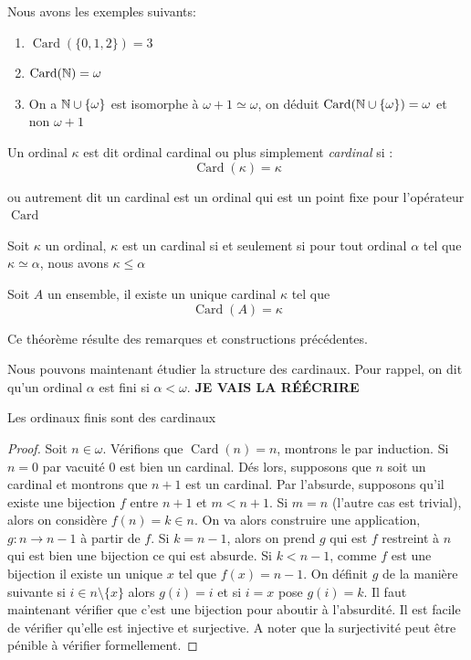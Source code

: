 \begin{exemple}
    Nous avons les exemples suivants:
    \begin{enumerate}
        \item $\operatorname{Card}(\{0,1,2\})=3$
        \item $\operatorname{Card}(\mathbb{N} )= \omega$
        \item On a $\mathbb{N}\cup \{\omega\}$ est isomorphe à $\omega+1\simeq \omega$, on déduit $\operatorname{Card}(\mathbb{N}\cup\{\omega\})=\omega$ et non $\omega+1$
    \end{enumerate}
\end{exemple}

\begin{definition}
    Un ordinal $\kappa$ est dit ordinal cardinal ou  plus simplement
    \emph{cardinal} si :
    \[ \operatorname{Card}(\kappa)=\kappa\]
\end{definition}
ou autrement dit un cardinal est un ordinal qui est un point fixe pour l'opérateur $\operatorname{Card}$

\begin{proposition}[caractérisation]
Soit $\kappa$ un ordinal, $\kappa$ est un cardinal si et seulement si pour tout ordinal $\alpha $ tel que $\kappa \simeq \alpha$, nous avons $\kappa \le \alpha $
\end{proposition}
\begin{theoreme}
    Soit $A$ un ensemble, il existe un unique cardinal $\kappa$ tel que $$\operatorname{Card}(A)= \kappa$$
\end{theoreme}
Ce  théorème résulte des remarques et constructions précédentes.

Nous pouvons maintenant étudier la structure des cardinaux. Pour rappel, on dit qu'un ordinal $\alpha$ est fini si $\alpha< \omega$.
\textbf{JE VAIS LA RÉÉCRIRE}
\begin{proposition}
    Les ordinaux finis sont des cardinaux
\end{proposition}


\begin{proof}
    Soit $n\in \omega$. Vérifions que $\operatorname{Card}(n)=n$, montrons le par induction. Si $n=0$ par vacuité $0$ est bien un cardinal. Dés lors, supposons que $n$ soit un cardinal et montrons que $n+1$ est un cardinal. Par l'absurde, supposons qu'il existe une bijection $f$ entre $n+1$ et $m<n+1$. Si $m= n$ (l'autre cas est trivial), alors on considère $f(n)=k\in n$. On va alors construire une application, $g:n\to n-1$ à partir de $f$. Si $k=n-1$, alors on prend $g$ qui est $f$ restreint à $n$ qui est bien une bijection ce qui est absurde. Si $k<n-1$, comme $f$ est une bijection il existe un unique $x$ tel que $f(x)=n-1$. On définit $g$ de la manière suivante si $i\in n\setminus\{x\}$ alors $g(i)=i$ et si $i=x$ pose $g(i)=k$. Il faut maintenant vérifier que c'est une bijection pour aboutir à l'absurdité. Il est facile de vérifier qu'elle est injective et surjective. A noter que la surjectivité peut être pénible à vérifier formellement. 
\end{proof}

